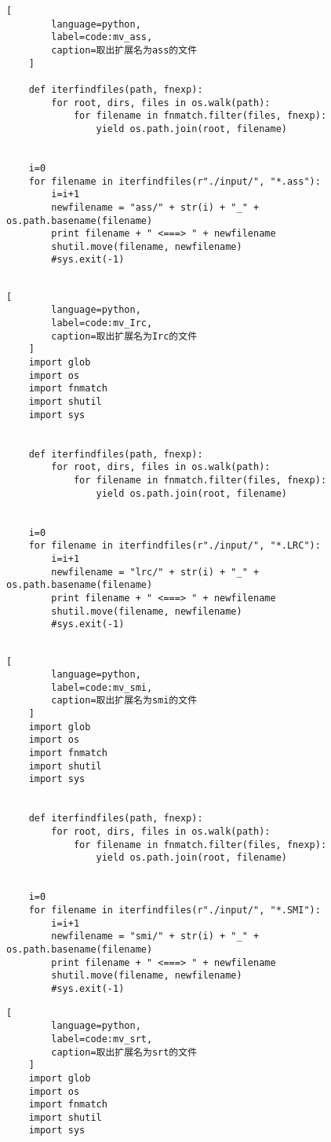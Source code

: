 \begin{appendices}
\begin{lstlisting}[
        language=python,
        label=code:mv_ass,
        caption=取出扩展名为ass的文件
    ]
    
    def iterfindfiles(path, fnexp):
        for root, dirs, files in os.walk(path):
            for filename in fnmatch.filter(files, fnexp):
                yield os.path.join(root, filename)
    
    
    i=0
    for filename in iterfindfiles(r"./input/", "*.ass"):
        i=i+1
        newfilename = "ass/" + str(i) + "_" + os.path.basename(filename)
        print filename + " <===> " + newfilename
        shutil.move(filename, newfilename)
        #sys.exit(-1)
    
    \end{lstlisting}
    \begin{lstlisting}[
        language=python,
        label=code:mv_Irc,
        caption=取出扩展名为Irc的文件
    ]
    import glob
    import os
    import fnmatch
    import shutil
    import sys
    
    
    def iterfindfiles(path, fnexp):
        for root, dirs, files in os.walk(path):
            for filename in fnmatch.filter(files, fnexp):
                yield os.path.join(root, filename)
    
    
    i=0
    for filename in iterfindfiles(r"./input/", "*.LRC"):
        i=i+1
        newfilename = "lrc/" + str(i) + "_" + os.path.basename(filename)
        print filename + " <===> " + newfilename
        shutil.move(filename, newfilename)
        #sys.exit(-1)
    
    \end{lstlisting}
    \begin{lstlisting}[
        language=python,
        label=code:mv_smi,
        caption=取出扩展名为smi的文件
    ]
    import glob
    import os
    import fnmatch
    import shutil
    import sys
    
    
    def iterfindfiles(path, fnexp):
        for root, dirs, files in os.walk(path):
            for filename in fnmatch.filter(files, fnexp):
                yield os.path.join(root, filename)
    
    
    i=0
    for filename in iterfindfiles(r"./input/", "*.SMI"):
        i=i+1
        newfilename = "smi/" + str(i) + "_" + os.path.basename(filename)
        print filename + " <===> " + newfilename
        shutil.move(filename, newfilename)
        #sys.exit(-1)
    \end{lstlisting}
    \begin{lstlisting}[
        language=python,
        label=code:mv_srt,
        caption=取出扩展名为srt的文件
    ]
    import glob
    import os
    import fnmatch
    import shutil
    import sys
    

\end{lstlisting}
\end{appendices}
